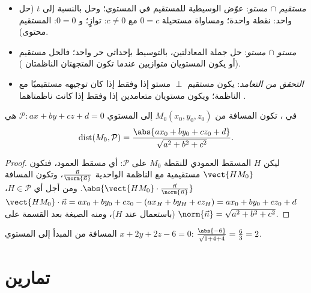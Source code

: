 \begin{method}\label{met:g12:space:intersections}
\begin{itemize}
  \item \emph{مستقيم $\cap$ مستو}: عوّض  الوسيطية
        للمستقيم في  المستوي؛ وحل بالنسبة إلى $t$ (حل واحد:
        نقطة واحدة؛ ومساواة مستحيلة $0 = c$ مع $c \neq 0$: توازٍ؛ و $0 = 0$: المستقيم محتوى).
  \item \emph{مستو $\cap$ مستو}: حل جملة المعادلتين،
        بالتوسيط بإحداثي حر واحد؛ فالحل مستقيم (أو يكون
        المستويان متوازيين عندما تكون المتجهتان الناظمتان ).
  \item \emph{التحقق من التعامد}: يكون مستقيم $\perp$ مستو إذا وفقط إذا كان توجيهه
        مستقيميًا مع الناظمة؛ ويكون مستويان متعامدين إذا وفقط إذا كانت
        ناظمتاهما .
\end{itemize}
\end{method}

\begin{proposition}\label{prop:g12:space:distance}
في ، تكون المسافة من $M_0(x_0, y_0, z_0)$ إلى
المستوي $\mathcal P : ax + by + cz + d = 0$ هي
\[
\operatorname{dist}(M_0, \mathcal P)
= \frac{\abs{ax_0 + by_0 + cz_0 + d}}{\sqrt{a^2 + b^2 + c^2}}.
\]
\end{proposition}

\begin{proof}
ليكن $H$ المسقط العمودي للنقطة $M_0$ على $\mathcal P$: أي مسقط
العمود، فتكون $\vect{HM_0}$ مستقيمية مع الناظمة الواحدية
$\frac{\vec n}{\norm{\vec n}}$، وتكون المسافة
$\abs{\vect{HM_0}\cdot \frac{\vec n}{\norm{\vec n}}}$. ومن أجل أي
$H \in \mathcal P$،
$\vect{HM_0}\cdot\vec n = ax_0 + by_0 + cz_0 - (ax_H + by_H + cz_H)
= ax_0 + by_0 + cz_0 + d$ (باستعمال  عند $H$)، ومنه الصيغة
بعد القسمة على $\norm{\vec n} = \sqrt{a^2+b^2+c^2}$.
\end{proof}

\begin{example}\label{ex:g12:space:distance}
المسافة من المبدأ إلى المستوي $x + 2y + 2z - 6 = 0$:
$\frac{\abs{-6}}{\sqrt{1 + 4 + 4}} = \frac63 = 2$.
\end{example}

\section{تمارين}

